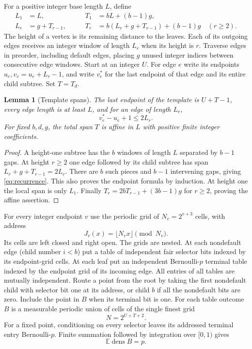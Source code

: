 \documentclass[11pt]{article}
\newtheorem{lemma}[theorem]{Lemma}
\theoremstyle{definition}
\theoremstyle{remark}
\newcommand{\dens}{\operatorname{dens}}
\begin{document}
For a positive integer base length $L$, define
\begin{equation}\label{eq:recurrence}
\begin{aligned}
 L_1&=L,\qquad & T_1&=bL+(b-1)g,\\
 L_r&=g+T_{r-1},\qquad &
 T_r&=b(L_r+g+T_{r-1})+(b-1)g\quad(r\geq2).
\end{aligned}
\end{equation}
The height of a vertex is its remaining distance to the leaves. Each of its
outgoing edges receives an integer window of length $L_r$ when its height is
$r$. Traverse edges in preorder, including default edges, placing $g$ unused
integer indices between consecutive edge windows. Start at an integer $U$.
For edge $e$ write its endpoints $u_e,v_e=u_e+L_r-1$, and write $v_e^*$ for
the last endpoint of that edge and its entire child subtree. Set $T=T_d$.

\begin{lemma}[Template spans]\label{lem:template}
The last endpoint of the template is $U+T-1$, every edge length is at least
$L$, and for an edge of length $L_r$,
\begin{equation}\label{eq:localspan}
 v_e^*-u_e+1\leq2L_r.
\end{equation}
For fixed $b,d,g$, the total span $T$ is affine in $L$ with positive finite
integer coefficients.
\end{lemma}
\begin{proof}
A height-one subtree has the $b$ windows of length $L$ separated by $b-1$
gaps. At height $r\geq2$ one edge followed by its child subtree has span
$L_r+g+T_{r-1}=2L_r$. There are $b$ such pieces and $b-1$ intervening gaps,
giving \eqref{eq:recurrence}. This also proves the endpoint formula by induction.
At height one the local span is only $L_1$. Finally
$T_r=2bT_{r-1}+(3b-1)g$ for $r\geq2$, proving the affine assertion.
\end{proof}

For every integer endpoint $v$ use the periodic grid of $N_v=2^{v+3}$ cells,
with address
\[
 J_v(x)=\lfloor N_vx\rfloor\pmod{N_v}.
\]
Its cells are left closed and right open. The grids are nested. At each
nondefault edge (child number $i<b$) put a table of independent fair selector
bits indexed by its endpoint-grid cells. At each leaf put an independent
Bernoulli-$p$ terminal table indexed by the endpoint grid of its incoming edge.
All entries of all tables are mutually independent. Route a point from the
root by taking the first nondefault child with selector bit one at its address,
or child $b$ if all the nondefault bits are zero. Include the point in $B$ when
its terminal bit is one. For each table outcome $B$ is a measurable periodic
union of cells of the single finest grid
\begin{equation}\label{eq:finest}
 N=2^{U+T+2}.
\end{equation}
For a fixed point, conditioning on every selector leaves its addressed terminal
entry Bernoulli-$p$. Finite summation followed by integration over $[0,1)$ gives
\begin{equation}\label{eq:expectedB}
 \mathbb E\dens B=p.
\end{equation}
\end{document}
